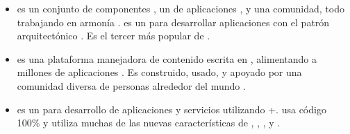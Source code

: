 \begin{itemize}
			\item
				\textbf{\symfonyNAME} es un conjunto de componentes \phpNAME, un \frameworkPC de aplicaciones \webINT, y una comunidad, todo trabajando en armonía \cite{online_technology_officialsite_symfony}. \symfonyNAME es un \softwarePC \freePC para desarrollar aplicaciones con el patrón arquitectónico \mvcAS. Es el tercer \frameworkPC más popular de \phpNAME \cite{online_popularity_php_proyects}.
			\item
				\textbf{\drupalNAME} es una plataforma \openSourcePC manejadora de contenido escrita en \phpNAME, alimentando a millones de aplicaciones \websitesINT. Es construido, usado, y apoyado por una comunidad diversa de personas alrededor del mundo \cite{online_drupal_official_site}.
			\item
				\textbf{\zendNAME {}} es un \openSourcePC \frameworkPC para desarrollo de aplicaciones \webINT y servicios utilizando +. \zendNAME {} usa código 100\% \objectOrientedPL y utiliza muchas de las nuevas características de , \namelyNamespacesPL, \lateStaticBindPL, \lambdaFuncPL y \closuresPL \cite{online_zend_framework}.

\end{itemize}
